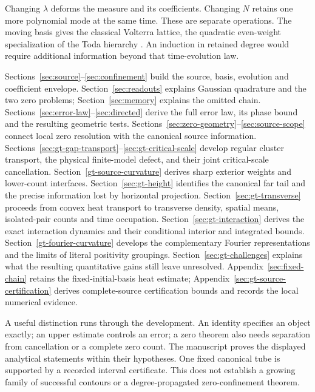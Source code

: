 \documentclass[11pt]{article}
\numberwithin{equation}{section}
\begin{document}
Changing \(\lambda\) deforms the measure and its coefficients.
Changing \(N\) retains one more polynomial mode at the same time.
These are separate operations. The moving basis gives the classical
Volterra lattice, the quadratic even-weight specialization of the
Toda hierarchy \cite[\S2.3]{vanassche}. An induction in retained degree
would require additional information beyond that time-evolution law.

Sections~\ref{sec:source}--\ref{sec:confinement} build the source,
basis, evolution and coefficient envelope.
Section~\ref{sec:readouts} explains Gaussian quadrature and the two
zero problems; Section~\ref{sec:memory} explains the omitted chain.
Sections~\ref{sec:error-law}--\ref{sec:directed} derive the full error
law, its phase bound and the resulting geometric tests.
Sections~\ref{sec:zero-geometry}--\ref{sec:source-scope} connect local
zero resolution with the canonical source information.
Sections~\ref{sec:gt-gap-transport}--\ref{sec:gt-critical-scale} develop
regular cluster transport, the physical finite-model defect, and their
joint critical-scale cancellation. Section~\ref{gt-source-curvature}
derives sharp exterior weights and lower-count interfaces.
Section~\ref{sec:gt-height} identifies the canonical far tail and the
precise information lost by horizontal projection.
Section~\ref{sec:gt-transverse} proceeds from convex heat transport to
transverse density, spatial means, isolated-pair counts and time occupation.
Section~\ref{sec:gt-interaction} derives the exact interaction dynamics
and their conditional interior and integrated bounds.
Section~\ref{gt-fourier-curvature} develops the complementary Fourier
representations and the limits of literal positivity groupings.
Section~\ref{sec:gt-challenges} explains what the resulting quantitative
gains still leave unresolved. Appendix~\ref{sec:fixed-chain} retains the
fixed-initial-basis heat estimate; Appendix~\ref{sec:gt-source-certification}
derives complete-source certification bounds and records the local
numerical evidence.

A useful distinction runs through the development. An identity
specifies an object exactly; an upper estimate controls an error;
a zero theorem also needs separation from cancellation or a complete
zero count. The manuscript proves the displayed analytical statements
within their hypotheses. One fixed canonical tube is supported by a recorded interval certificate.
This does not establish a growing family of successful contours or a
degree-propagated zero-confinement theorem.
\end{document}
